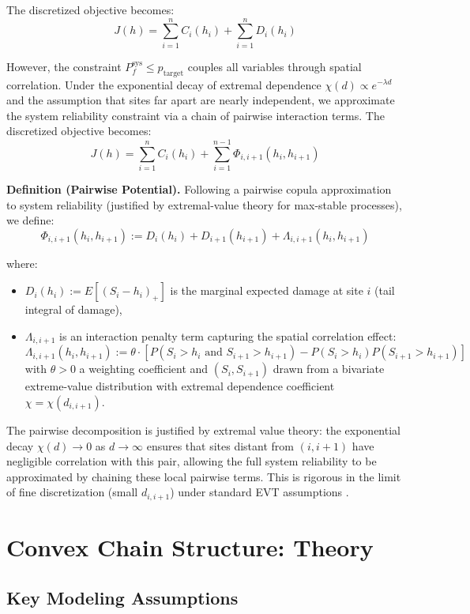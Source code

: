 \documentclass[12pt]{article}
\theoremstyle{definition}
\begin{document}
The discretized objective becomes:
\[
J(h) = \sum_{i=1}^n C_i(h_i) + \sum_{i=1}^n D_i(h_i)
\]

However, the constraint $P_f^{\text{sys}} \leq p_{\text{target}}$ couples all variables through spatial correlation. Under the exponential decay of extremal dependence $\chi(d) \propto e^{-\lambda d}$ and the assumption that sites far apart are nearly independent, we approximate the system reliability constraint via a chain of pairwise interaction terms. The discretized objective becomes:
\[
J(h) = \sum_{i=1}^n C_i(h_i) + \sum_{i=1}^{n-1} \Phi_{i,i+1}(h_i, h_{i+1})
\]

\noindent\textbf{Definition (Pairwise Potential).} Following a pairwise copula approximation to system reliability (justified by extremal-value theory for max-stable processes), we define:
\[
\Phi_{i,i+1}(h_i, h_{i+1}) := D_i(h_i) + D_{i+1}(h_{i+1}) + \Lambda_{i,i+1}(h_i, h_{i+1})
\]

where:
\begin{itemize}
    \item $D_i(h_i) := E[(S_i - h_i)_+]$ is the marginal expected damage at site $i$ (tail integral of damage),
    \item $\Lambda_{i,i+1}$ is an interaction penalty term capturing the spatial correlation effect:
    \[
    \Lambda_{i,i+1}(h_i, h_{i+1}) := \theta \cdot \left[ P(S_i > h_i \text{ and } S_{i+1} > h_{i+1}) - P(S_i > h_i) P(S_{i+1} > h_{i+1}) \right]
    \]
    with $\theta > 0$ a weighting coefficient and $(S_i, S_{i+1})$ drawn from a bivariate extreme-value distribution with extremal dependence coefficient $\chi = \chi(d_{i,i+1})$.
\end{itemize}

\noindent The pairwise decomposition is justified by extremal value theory: the exponential decay $\chi(d) \to 0$ as $d \to \infty$ ensures that sites distant from $(i, i+1)$ have negligible correlation with this pair, allowing the full system reliability to be approximated by chaining these local pairwise terms. This is rigorous in the limit of fine discretization (small $d_{i,i+1}$) under standard EVT assumptions \cite{DeHaan:ExtremeValue}.

\section{Convex Chain Structure: Theory}

\subsection*{Key Modeling Assumptions}
\end{document}
